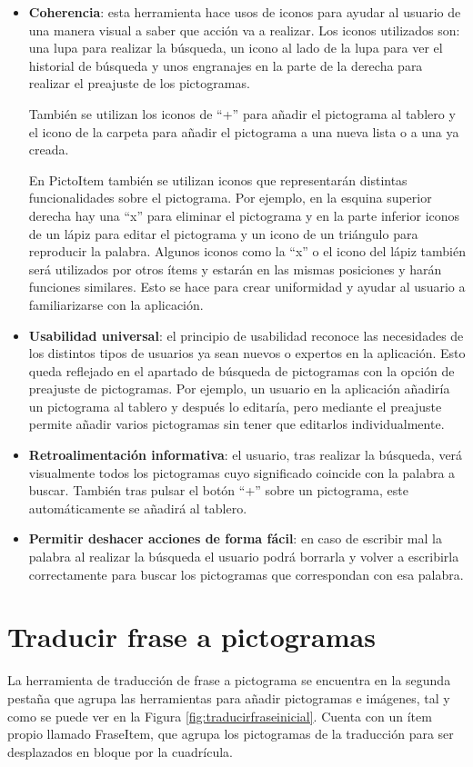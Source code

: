 \begin{itemize}
	\item \textbf{Coherencia}: esta herramienta hace usos de iconos para ayudar al usuario de una manera visual a saber que acción va a realizar. Los iconos utilizados son: una lupa para realizar la búsqueda, un icono al lado de la lupa para ver el historial de búsqueda y unos engranajes en la parte de la derecha para realizar el preajuste de los pictogramas.
	
	También se utilizan los iconos de “+” para añadir el pictograma al tablero y el icono de la carpeta para añadir el pictograma a una nueva lista o a una ya creada.
	
	En PictoItem también se utilizan iconos que representarán distintas funcionalidades sobre el pictograma. Por ejemplo, en la esquina superior derecha hay una “x” para eliminar el pictograma y en la parte inferior iconos de un lápiz para editar el pictograma y un icono de un triángulo para reproducir la palabra. Algunos iconos como la “x” o el icono del lápiz también será utilizados por otros ítems y estarán en las mismas posiciones y harán funciones similares. Esto se hace para crear uniformidad y ayudar al usuario a familiarizarse con la aplicación.
	
	
	\item \textbf{Usabilidad universal}: el principio de usabilidad reconoce las necesidades de los distintos tipos de usuarios ya sean nuevos o expertos en la aplicación. Esto queda reflejado en el apartado de búsqueda de pictogramas con la opción de preajuste de pictogramas. Por ejemplo, un usuario en la aplicación añadiría un pictograma al tablero y después lo editaría, pero mediante el preajuste permite añadir varios pictogramas sin tener que editarlos individualmente.
	
	\item \textbf{Retroalimentación informativa}: el usuario, tras realizar la búsqueda, verá visualmente todos los pictogramas cuyo significado coincide con la palabra a buscar. También tras pulsar el botón “+” sobre un pictograma, este automáticamente se añadirá al tablero.
	
	
	\item \textbf{Permitir deshacer acciones de forma fácil}: en caso de escribir mal la palabra al realizar la búsqueda el usuario podrá borrarla y volver a escribirla correctamente para buscar los pictogramas que correspondan con esa palabra.
\end{itemize}


\section{Traducir frase a pictogramas}
\label{cap5:sec:traduccion}
La herramienta de traducción de frase a pictograma se encuentra en la segunda pestaña que agrupa las herramientas para añadir pictogramas e imágenes, tal y como se puede ver en la Figura \ref{fig:traducirfraseinicial}. Cuenta con un ítem propio llamado FraseItem, que agrupa los pictogramas de la traducción para ser desplazados en bloque por la cuadrícula.


